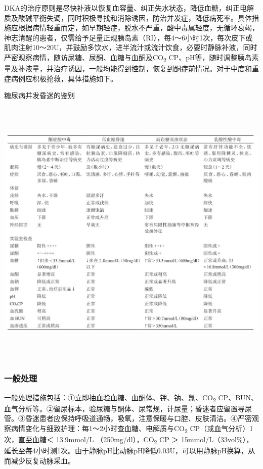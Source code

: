 DKA的治疗原则是尽快补液以恢复血容量、纠正失水状态，降低血糖，纠正电解质及酸碱平衡失调，同时积极寻找和消除诱因，防治并发症，降低病死率。具体措施应根据病情轻重而定，如早期轻症，脱水不严重，酸中毒属轻度，无循环衰竭，神志清醒的患者，仅需给予足量正规胰岛素（RI），每4～6小时1次，每次皮下或肌肉注射10～20U，并鼓励多饮水，进半流汁或流汁饮食，必要时静脉补液，同时严密观察病情，随访尿糖、尿酮、血糖与血酮及CO\textsubscript{2}
CP、pH等，随时调整胰岛素量及补液量，并治疗诱因，一般均能得到控制，恢复到酮症前情况。对于中度和重症病例应积极抢救，具体措施如下。

\begin{table}[htbp]
\centering
\caption{糖尿病并发昏迷的鉴别}
\label{tab49-1}
\includegraphics[width=6.6875in,height=5.17708in]{./images/Image00165.jpg}
\end{table}

\subsubsection{一般处理}

一般处理措施包括：①立即抽血验血糖、血酮体、钾、钠、氯、CO\textsubscript{2}
CP、BUN、血气分析等。②留尿标本，验尿糖与酮体、尿常规，计尿量；昏迷者应留置导尿管。③昏迷患者应保持呼吸道通畅，吸氧，注意保暖与口腔、皮肤清洁。④严密观察病情变化与细致护理：每1～2小时查血糖、电解质与CO\textsubscript{2}
CP（或血气分析）1次，直至血糖＜ 13.9mmol/L
（250mg/dl），CO\textsubscript{2} CP ＞
15mmol/L（33vol\%），延长至每4小时测1次。由于静脉pH比动脉pH降低0.03U，可以用静脉pH换算，从而减少反复动脉采血。

